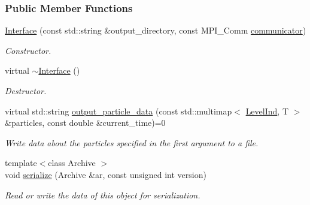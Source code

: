 \subsubsection*{Public Member Functions}
\begin{DoxyCompactItemize}
\item 
\hyperlink{classps__mmm_1_1_particle_1_1_output_1_1_interface_a7283e626e8d6e6e379e67034a698ccad}{Interface} (const std\+::string \&output\+\_\+directory, const M\+P\+I\+\_\+\+Comm \hyperlink{classps__mmm_1_1_particle_1_1_output_1_1_interface_ae3fcfd82092c40864ec09918f03b91d0}{communicator})
\begin{DoxyCompactList}\small\item\em Constructor. \end{DoxyCompactList}\item 
virtual \hyperlink{classps__mmm_1_1_particle_1_1_output_1_1_interface_a43cb6a344174755a8f5b73c59b0a937d}{$\sim$\+Interface} ()
\begin{DoxyCompactList}\small\item\em Destructor. \end{DoxyCompactList}\item 
virtual std\+::string \hyperlink{classps__mmm_1_1_particle_1_1_output_1_1_interface_a4ed5410d2d46dbb96073addd4b6f5310}{output\+\_\+particle\+\_\+data} (const std\+::multimap$<$ \hyperlink{namespaceps__mmm_1_1_particle_a475174140997ceb63cc9e801b6c0c4b8}{Level\+Ind}, T $>$ \&particles, const double \&current\+\_\+time)=0
\begin{DoxyCompactList}\small\item\em Write data about the particles specified in the first argument to a file. \end{DoxyCompactList}\item 
{\footnotesize template$<$class Archive $>$ }\\void \hyperlink{classps__mmm_1_1_particle_1_1_output_1_1_interface_ae22cfae7a2737096b3220dbd5ca4e719}{serialize} (Archive \&ar, const unsigned int version)
\begin{DoxyCompactList}\small\item\em Read or write the data of this object for serialization. \end{DoxyCompactList}\end{DoxyCompactItemize}
